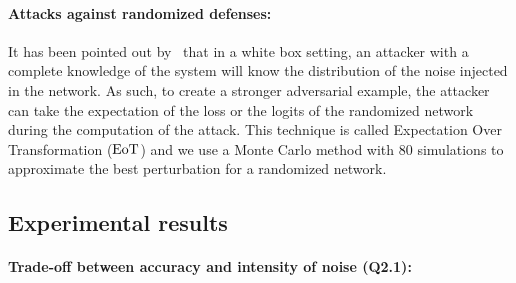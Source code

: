 \paragraph{Attacks against randomized defenses:}
It has been pointed out by~\citet{athalye2017synthesizing,carlini2019evaluating} that in a white box setting, an attacker with a complete knowledge of the system will know the distribution of the noise injected in the network.
As such, to create a stronger adversarial example, the attacker can take the expectation of the loss or the logits of the randomized network during the computation of the attack.
This technique is called Expectation Over Transformation ($\operatorname*{EoT}$) and we use a Monte Carlo method with $80$ simulations to approximate the best perturbation for a randomized network. 

\subsection{Experimental results}

\paragraph{Trade-off between accuracy and intensity of noise (Q2.1):}

